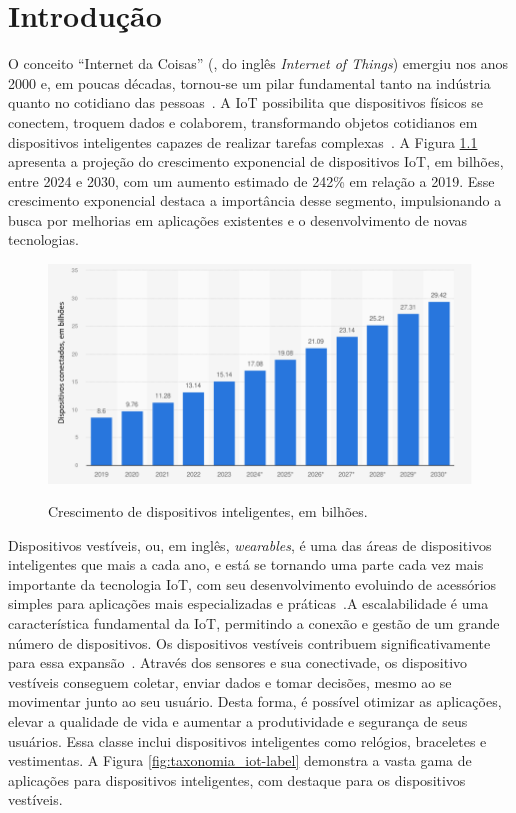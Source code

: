 \chapter{Introdução}
\label{chap:introducao}

O conceito ``Internet da Coisas'' (, do inglês \textit{Internet of Things}) emergiu nos anos 2000 e, em poucas décadas, tornou-se um pilar fundamental tanto na indústria quanto no cotidiano das pessoas~\cite{Farahsari2022}. A IoT possibilita que dispositivos físicos se conectem, troquem dados e colaborem, transformando objetos cotidianos em dispositivos inteligentes capazes de realizar tarefas complexas~\cite{Fuqaha2015}. A Figura \ref{fig:crescimento_iot-label} apresenta a projeção do crescimento exponencial de dispositivos IoT, em bilhões, entre 2024 e 2030, com um aumento estimado de 242\% em relação a 2019. Esse crescimento exponencial destaca a importância desse segmento, impulsionando a busca por melhorias em aplicações existentes e o desenvolvimento de novas tecnologias.

\begin{figure}[ht]
    \centering
    \caption{Crescimento de dispositivos inteligentes, em bilhões.}
    \includegraphics[width=\textwidth]{Imagens/crescimento_iot.png}
    \label{fig:crescimento_iot-label}
\end{figure}


Dispositivos vestíveis, ou, em inglês, \textit{wearables}, é uma das áreas de dispositivos inteligentes que mais a cada ano, e está se tornando uma parte cada vez mais importante da tecnologia IoT, com seu desenvolvimento evoluindo de acessórios simples para aplicações mais especializadas e práticas~\cite{Dian2020}.A escalabilidade é uma característica fundamental da IoT, permitindo a conexão e gestão de um grande número de dispositivos. Os dispositivos vestíveis contribuem significativamente para essa expansão~\cite{Islam2023}. Através dos sensores e sua conectivade, os dispositivo vestíveis conseguem coletar, enviar dados e tomar decisões, mesmo ao se movimentar junto ao seu usuário. Desta forma, é possível otimizar as aplicações, elevar a qualidade de vida e aumentar a produtividade e segurança de seus usuários. Essa classe inclui dispositivos inteligentes como relógios, braceletes e vestimentas. A Figura \ref{fig:taxonomia_iot-label} demonstra a vasta gama de aplicações para dispositivos inteligentes, com destaque para os dispositivos vestíveis.

